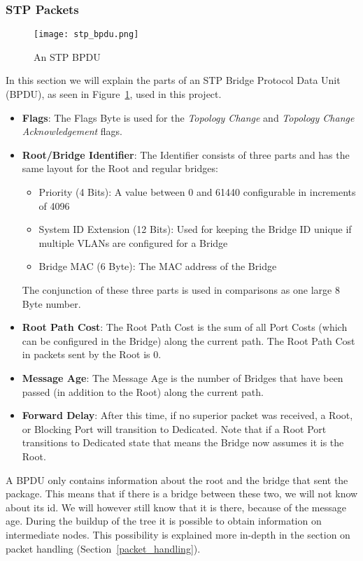 \subsubsection{STP Packets}
\label{stp_packet}
\begin{figure}[h]
    \centering
    \texttt{[image: stp\_bpdu.png]}
    \caption{An STP BPDU}
    \label{fig:stp_bpdu}
\end{figure}
In this section we will explain the parts of an STP Bridge Protocol Data Unit (BPDU), as seen in Figure~\ref{fig:stp_bpdu}, used in this project.
\begin{itemize}
    \item \textbf{Flags}: The Flags Byte is used for the \textit{Topology Change} and \textit{Topology Change Acknowledgement} flags.
    \item \textbf{Root/Bridge Identifier}: The Identifier consists of three parts and has the same layout for the Root and regular bridges:
        \begin{itemize}
            \item Priority (4 Bits): A value between 0 and 61440 configurable in increments of 4096
            \item System ID Extension (12 Bits): Used for keeping the Bridge ID unique if multiple VLANs are configured for a Bridge
            \item Bridge MAC (6 Byte): The MAC address of the Bridge
        \end{itemize}
        The conjunction of these three parts is used in comparisons as one large 8 Byte number.
    \item \textbf{Root Path Cost}: The Root Path Cost is the sum of all Port Costs (which can be configured in the Bridge) along the current path. The Root Path Cost in packets sent by the Root is 0.
    \item \textbf{Message Age}: The Message Age is the number of Bridges that have been passed (in addition to the Root) along the current path.
    \item \textbf{Forward Delay}: After this time, if no superior packet was received, a Root, or Blocking Port will transition to Dedicated.
        Note that if a Root Port transitions to Dedicated state that means the Bridge now assumes it is the Root.
\end{itemize}
A BPDU only contains information about the root and the bridge that sent the package.
This means that if there is a bridge between these two, we will not know about its id.
We will however still know that it is there, because of the message age.
During the buildup of the tree it is possible to obtain information on intermediate nodes.
This possibility is explained more in-depth in the section on packet handling (Section~\ref{packet_handling}).

